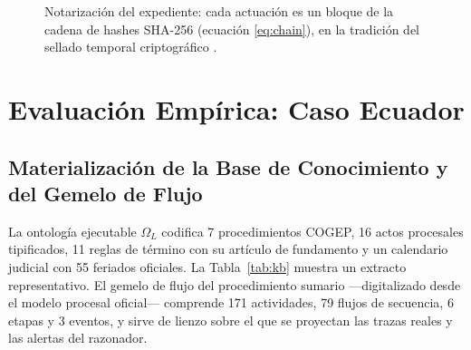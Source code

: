 \documentclass[computers,article,submit,pdftex,moreauthors]{Definitions/mdpi}
\begin{document}
\begin{figure}[H]
\centering
{}
\caption{Notarización del expediente: cada actuación es un bloque de la cadena de hashes SHA-256 (ecuación \eqref{eq:chain}), en la tradición del sellado temporal criptográfico \cite{Haber1991}.}
\label{fig:chain}
\end{figure}

\section{Evaluación Empírica: Caso Ecuador}
\label{sec:results}

\subsection{Materialización de la Base de Conocimiento y del Gemelo de Flujo}
La ontología ejecutable $\Omega_L$ codifica 7 procedimientos COGEP, 16 actos procesales tipificados, 11 reglas de término con su artículo de fundamento y un calendario judicial con 55 feriados oficiales. La Tabla~\ref{tab:kb} muestra un extracto representativo. El gemelo de flujo del procedimiento sumario ---digitalizado desde el modelo procesal oficial--- comprende 171 actividades, 79 flujos de secuencia, 6 etapas y 3 eventos, y sirve de lienzo sobre el que se proyectan las trazas reales y las alertas del razonador.
\end{document}
